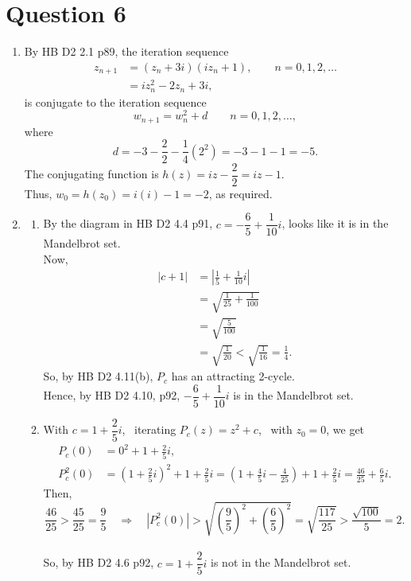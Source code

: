 \section{Question 6}
\begin{enumerate}[label=(\alph*)]
    \item 
    By HB D2 2.1 p89, the iteration sequence
    \begin{align*}
        z_{n+1} &= (z_n + 3i)(iz_n + 1), \qquad n = 0,1,2, \ldots \\
        &= iz^2_n - 2z_n + 3i,
    \end{align*}
    is conjugate to the iteration sequence
\[ w_{n+1} = w^2_n + d  \qquad n= 0,1,2, \ldots, \]
where
\[ d = -3 - \frac{2}{2} - \frac{1}{4}(2^2) = -3-1-1 = -5 . \]
The conjugating function is $ h(z) = iz - \dfrac{2}{2} = iz - 1 $. 
\vs \\
Thus, $ w_0 = h(z_0) = i(i)-1 = -2 $, as required.
\vs \\
\item 
\begin{enumerate}[label=(\roman*)]
    \item 
    By the diagram in HB D2 4.4 p91, $ c = -\dfrac{6}{5} + \dfrac{1}{10}i $, looks like it is in the Mandelbrot set.
    \vs \\
    Now,
    \begin{align*}
        |c+1| &=\left| \frac{1}{5} + \frac{1}{10}i  \right| \\ 
              &= \sqrt{ \frac{1}{25} + \frac{1}{100} } \\
              &= \sqrt{ \frac{5}{100} } \\
              &= \sqrt{\frac{1}{20}} < \sqrt{ \frac{1}{16} } = \frac{1}{4}.
    \end{align*}
    So, by HB D2 4.11(b), $P_c$ has an attracting 2-cycle. 
    \vs \\
    Hence, by HB D2 4.10, p92, $ -\dfrac{6}{5} + \dfrac{1}{10}i $ is in the Mandelbrot set.
    \vs \\
    \item 
    With $ c = 1 + \dfrac{2}{5}i $, \ iterating $P_c(z) = z^2 + c$, \ with $z_0 = 0$, we get
    \begin{align*}
        P_c(0)   &= 0^2 + 1 + \frac{2}{5}i, \\
        P^2_c(0) &=  \left(1 + \frac{2}{5}i\right)^2 + 1 + \frac{2}{5}i = \left(1 + \frac{4}{5}i - \frac{4}{25}\right) + 1 + \frac{2}{5}i = \frac{46}{25} + \frac{6}{5}i.
    \end{align*}
    Then,
    \[
    \frac{46}{25} > \frac{45}{25} = \frac{9}{5}\quad \Rightarrow \quad \left| P^2_c(0) \right| > \sqrt{\left(\frac{9}{5}\right)^2 + \left(\frac{6}{5}\right)^2}  = \sqrt{\frac{117}{25}} > \frac{\sqrt{100}}{5} = 2.
    \]
    \vs \\
    So, by HB D2 4.6 p92, $ c = 1 + \dfrac{2}{5}i $ is not in the Mandelbrot set.
\end{enumerate}
\end{enumerate}
